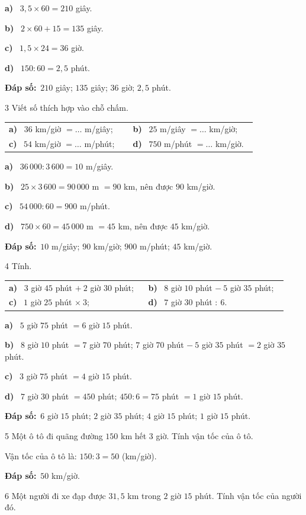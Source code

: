 \documentclass[11pt]{article}
\makeatletter
\newif\ifsol \solfalse
\renewcommand{\arraystretch}{1.35}
\providecommand{\AnsWord}{Đáp số}
\newcommand{\dapso}[1]{\par\textbf{\AnsWord:}\ #1}
\newcommand{\probsol}[1]{%
  \begin{lrbox}{\solmeasure}\begin{minipage}{\dimexpr\linewidth-24pt\relax}#1\end{minipage}\end{lrbox}%
  \ifsol
    \begin{solbox}#1\end{solbox}%
  \else
    \setlength{\solht}{\dimexpr\ht\solmeasure+\dp\solmeasure+0.85cm\relax}%
    \ifdim\solht<1.35cm\setlength{\solht}{1.35cm}\fi
    \begin{tcolorbox}[colback=white,colframe=Line,boxrule=0.8pt,arc=5pt,
      left=8pt,right=8pt,top=4pt,bottom=4pt,height=\solht]{\footnotesize\color{Slate}\itshape\WorkWord}\end{tcolorbox}%
  \fi}
\newcommand{\pa}[1]{\textbf{#1)}\ }
\newenvironment{cols2}{\par\vspace{3pt}\noindent\setlength{\tabcolsep}{0pt}\renewcommand{\arraystretch}{1.3}%
  \begin{tabular}{@{}>{\raggedright\arraybackslash\rule{0pt}{4.4ex}}p{0.48\linewidth}<{\rule[-2.3ex]{0pt}{0pt}}@{\hspace{0.03\linewidth}}>{\raggedright\arraybackslash\rule{0pt}{4.4ex}}p{0.48\linewidth}<{\rule[-2.3ex]{0pt}{0pt}}@{}}}%
  {\end{tabular}\par}
\newcommand{\gap}{\vspace{0.3cm}}
\def\WorkWord{Bài làm:}
\def\AnsWord{Đáp số}
\makeatother
\begin{document}
\probsol{
\pa{a} $3{,}5\times60=210$ giây.\par \pa{b} $2\times60+15=135$ giây.\par \pa{c} $1{,}5\times24=36$ giờ.\par \pa{d} $150:60=2{,}5$ phút.
\dapso{$210$ giây; $135$ giây; $36$ giờ; $2{,}5$ phút.}}
\gap
\begin{probbox}{3}{\relax}
Viết số thích hợp vào chỗ chấm.
\begin{cols2}
\pa{a} $36$ km/giờ $=\dots$ m/giây; & \pa{b} $25$ m/giây $=\dots$ km/giờ;\\
\pa{c} $54$ km/giờ $=\dots$ m/phút; & \pa{d} $750$ m/phút $=\dots$ km/giờ.
\end{cols2}
\end{probbox}
\probsol{
\pa{a} $36\,000:3\,600=10$ m/giây.\par
\pa{b} $25\times3\,600=90\,000$ m $=90$ km, nên được $90$ km/giờ.\par
\pa{c} $54\,000:60=900$ m/phút.\par
\pa{d} $750\times60=45\,000$ m $=45$ km, nên được $45$ km/giờ.
\dapso{$10$ m/giây; $90$ km/giờ; $900$ m/phút; $45$ km/giờ.}}
\gap
\begin{probbox}{4}{\relax}
Tính.
\begin{cols2}
\pa{a} $3$ giờ $45$ phút $+\ 2$ giờ $30$ phút; & \pa{b} $8$ giờ $10$ phút $-\ 5$ giờ $35$ phút;\\
\pa{c} $1$ giờ $25$ phút $\times\ 3$; & \pa{d} $7$ giờ $30$ phút $:\ 6$.
\end{cols2}
\end{probbox}
\probsol{
\pa{a} $5$ giờ $75$ phút $=6$ giờ $15$ phút.\par
\pa{b} $8$ giờ $10$ phút $=7$ giờ $70$ phút; $7$ giờ $70$ phút $-\ 5$ giờ $35$ phút $=2$ giờ $35$ phút.\par
\pa{c} $3$ giờ $75$ phút $=4$ giờ $15$ phút.\par
\pa{d} $7$ giờ $30$ phút $=450$ phút; $450:6=75$ phút $=1$ giờ $15$ phút.
\dapso{$6$ giờ $15$ phút; $2$ giờ $35$ phút; $4$ giờ $15$ phút; $1$ giờ $15$ phút.}}
\gap
\begin{probbox}{5}{\relax}
Một ô tô đi quãng đường $150$ km hết $3$ giờ. Tính vận tốc của ô tô.
\end{probbox}
\probsol{
Vận tốc của ô tô là: $150:3=50$ (km/giờ).
\dapso{$50$ km/giờ.}}
\gap
\begin{probbox}{6}{\relax}
Một người đi xe đạp được $31{,}5$ km trong $2$ giờ $15$ phút. Tính vận tốc của người đó.
\end{probbox}
\end{document}
